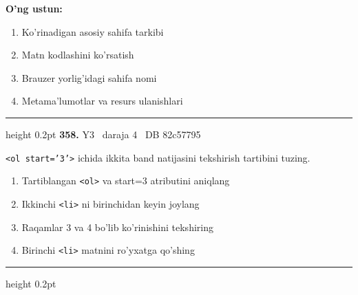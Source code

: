 \documentclass[10pt,a4paper,oneside]{article}
\begin{document}
\textbf{\footnotesize O'ng ustun:}
\begin{enumerate}[label=\Alph*),leftmargin=9mm]
\item Ko'rinadigan asosiy sahifa tarkibi
\item Matn kodlashini ko'rsatish
\item Brauzer yorlig'idagi sahifa nomi
\item Metama'lumotlar va resurs ulanishlari
\end{enumerate}
\vspace{2mm}\hrule height 0.2pt \vspace{4mm}
\hypertarget{q358}{\textbf{\color{ink}358.}}  {\color{muted}\scriptsize Y3 \textbullet\ daraja 4 \textbullet\ DB 82c57795}
\par
\texttt{\textless{}ol start='3'\textgreater{}} ichida ikkita band natijasini tekshirish tartibini tuzing.
\begin{enumerate}[label=\Alph*),leftmargin=9mm]
\item Tartiblangan \texttt{\textless{}ol\textgreater{}} va start=3 atributini aniqlang
\item Ikkinchi \texttt{\textless{}li\textgreater{}} ni birinchidan keyin joylang
\item Raqamlar 3 va 4 bo'lib ko'rinishini tekshiring
\item Birinchi \texttt{\textless{}li\textgreater{}} matnini ro'yxatga qo'shing
\end{enumerate}
\vspace{2mm}\hrule height 0.2pt \vspace{4mm}
\end{document}
